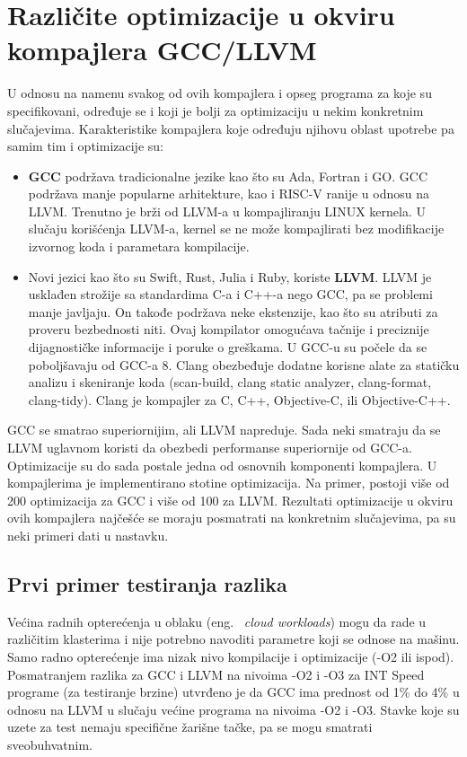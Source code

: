 \documentclass[a4paper]{article}
\begin{document}
\section{Različite optimizacije u okviru kompajlera GCC/LLVM}
\label{subsec:razlike}

U odnosu na namenu svakog od ovih kompajlera  i opseg programa za koje su specifikovani, određuje se i koji je bolji za optimizaciju u nekim konkretnim slučajevima.
Karakteristike kompajlera koje određuju njihovu oblast upotrebe pa samim tim i optimizacije su: 
\begin{itemize}
  \item \textbf{GCC} podržava tradicionalne jezike kao što su Ada, Fortran i GO.
         GCC podržava manje popularne arhitekture, kao i RISC-V ranije u odnosu na LLVM.
         Trenutno je brži od LLVM-a u  kompajliranju LINUX kernela. 
         U slučaju korišćenja LLVM-a, kernel se ne može kompajlirati bez modifikacije izvornog koda i parametara kompilacije.
  \item  Novi jezici  kao što su Swift, Rust, Julia i Ruby, koriste \textbf{LLVM}.
          LLVM je usklađen strožije sa standardima C-a i C++-a nego GCC, pa se problemi manje javljaju.
          On takođe podržava neke ekstenzije, kao što su atributi za proveru bezbednosti niti.
          Ovaj kompilator omogućava tačnije i preciznije dijagnostičke informacije i poruke o greškama. U GCC-u su počele da se poboljšavaju od GCC-a 8.
          Clang obezbeđuje dodatne korisne alate za statičku analizu i skeniranje koda (scan-build, clang static analyzer, clang-format, clang-tidy).
          Clang je kompajler  za C, C++, Objective-C, ili Objective-C++.
\end{itemize}
GCC se smatrao superiornijim, ali LLVM napreduje. Sada neki smatraju da se LLVM uglavnom koristi da obezbedi performanse superiornije od GCC-a.
\\ Optimizacije su do sada postale jedna od osnovnih komponenti kompa\-jlera. 
U kompajlerima je implementirano stotine optimizacija. 
Na primer, postoji više od 200 optimizacija za GCC i više od 100 za LLVM.  
Rezultati optimizacije u okviru ovih kompajlera najčešće se moraju posmatrati na konkretnim slučajevima, pa  su neki primeri dati u nastavku.

\subsection{Prvi primer testiranja razlika}
\label{subsec:primer1}
Većina radnih opterećenja u oblaku (eng. ~{\em cloud workloads}) mogu da rade u različitim klasterima i nije potrebno navoditi parametre koji se odnose na mašinu. 
Samo radno opterećenje ima nizak nivo kompilacije i optimizacije (-O2 ili ispod).
Posmatranjem razlika za GCC i LLVM na nivoima -O2 i -O3 za INT Speed programe (za testiranje brzine) utvrđeno je da 
GCC ima prednost od 1\% do 4\% u odnosu na LLVM u slučaju većine programa na nivoima -O2 i -O3. 
Stavke koje su uzete za test nemaju specifične žarišne tačke, pa se mogu smatrati sveobuhvatnim.
\end{document}
